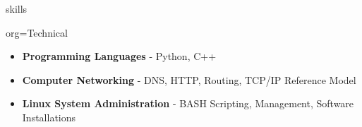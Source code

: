 \documentclass{resume}
\begin{document}
\begin{ResumeSection}{skills}
    \newcommand{\skill}[2]{\textbf{#1} - #2}
    \begin{ResumeSubsection}{org=Technical}
        \begin{itemize}
            \item \skill{Programming Languages}{Python, C++}
            \item \skill{Computer Networking}{DNS, HTTP, Routing, TCP/IP Reference Model}
            \item \skill{Linux System Administration}{BASH Scripting, Management, Software Installations}
        \end{itemize}
    \end{ResumeSubsection}
\end{ResumeSection}
\end{document}
